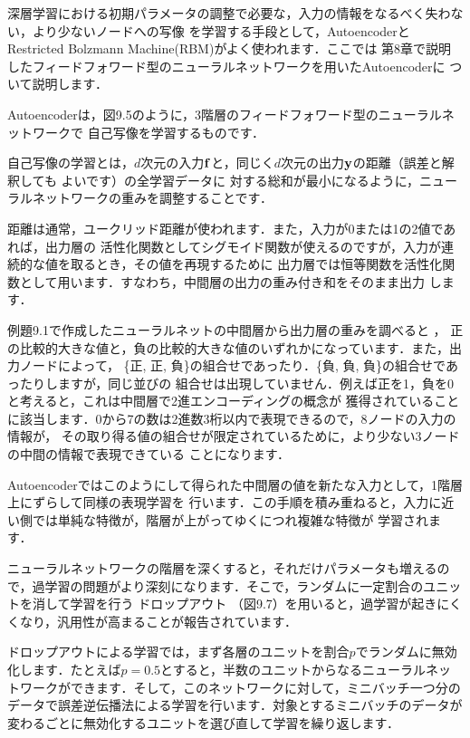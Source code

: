 
深層学習における初期パラメータの調整で必要な，入力の情報をなるべく失わない，より少ないノードへの写像
を学習する手段として，AutoencoderとRestricted Bolzmann Machine(RBM)がよく使われます．ここでは
第8章で説明したフィードフォワード型のニューラルネットワークを用いたAutoencoderに
ついて説明します．

Autoencoderは，図9.5のように，3階層のフィードフォワード型のニューラルネットワークで
自己写像を学習するものです．

自己写像の学習とは，$d$次元の入力${\bf f}$と，同じく$d$次元の出力${\bf y}$の距離（誤差と解釈しても
よいです）の全学習データに
対する総和が最小になるように，ニューラルネットワークの重みを調整することです．

距離は通常，ユークリッド距離が使われます．また，入力が0または1の2値であれば，出力層の
活性化関数としてシグモイド関数が使えるのですが，入力が連続的な値を取るとき，その値を再現するために
出力層では恒等関数を活性化関数として用います．すなわち，中間層の出力の重み付き和をそのまま出力
します．


例題9.1で作成したニューラルネットの中間層から出力層の重みを調べると
，
正の比較的大きな値と，負の比較的大きな値のいずれかになっています．また，出力ノードによって，
\{正, 正, 負\}の組合せであったり．\{負, 負, 負\}の組合せであったりしますが，同じ並びの
組合せは出現していません．例えば正を1，負を0と考えると，これは中間層で2進エンコーディングの概念が
獲得されていることに該当します．0から7の数は2進数3桁以内で表現できるので，8ノードの入力の情報が，
その取り得る値の組合せが限定されているために，より少ない3ノードの中間の情報で表現できている
ことになります．


Autoencoderではこのようにして得られた中間層の値を新たな入力として，1階層上にずらして同様の表現学習を
行います．この手順を積み重ねると，入力に近い側では単純な特徴が，階層が上がってゆくにつれ複雑な特徴が
学習されます．


ニューラルネットワークの階層を深くすると，それだけパラメータも増えるので，過学習の問題がより深刻になります．そこで，ランダムに一定割合のユニットを消して学習を行う
ドロップアウト
（図9.7）を用いると，過学習が起きにくくなり，汎用性が高まることが報告されています．

ドロップアウトによる学習では，まず各層のユニットを割合$p$でランダムに無効化します．たとえば$p=0.5$とすると，半数のユニットからなるニューラルネットワークができます．そして，このネットワークに対して，ミニバッチ一つ分のデータで誤差逆伝播法による学習を行います．対象とするミニバッチのデータが変わるごとに無効化するユニットを選び直して学習を繰り返します．

